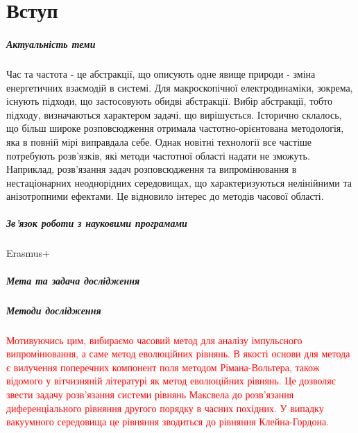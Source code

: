 \chapter*{Вступ}

\paragraph{Актуальність теми}

Час та частота - це абстракції, що описують одне явище природи - зміна
енергетичних взаємодій в системі. Для макроскопічної електродинаміки, зокрема,
існують підходи, що застосовують обидві абстракції. Вибір абстракції, тобто 
підходу, визначаються характером задачі, що вирішується. Історично склалось, що
більш широке розповсюдження отримала частотно-орієнтована методологія, яка в 
повній мірі виправдала себе. Однак новітні технології все частіше потребують 
розв'язків, які методи частотної області надати не зможуть. Наприклад, 
розв'язання задач розповсюдження та випромінювання в нестаціонарних 
неоднорідних середовищах, що характеризуються нелінійними та анізотропними 
ефектами. Це відновило інтерес до методів часової області.

\paragraph{Зв'язок роботи з науковими програмами}

Erasmus+

\paragraph{Мета та задача дослідження}

\paragraph{Методи дослідження}

\textcolor{red}{
Мотивуючись цим, вибираємо часовий метод для аналізу імпульсного випромінювання,
а саме метод еволюційних рівнянь. В якості основи для метода є вилучення 
поперечних компонент поля методом Рімана-Вольтера, також відомого у вітчизняній 
літературі як метод еволюційних рівнянь. Це дозволяє звести задачу розв'язання 
системи рівнянь Максвела до розв'язання диференціального рівняння другого 
порядку в часних похідних. У випадку вакуумного середовища це рівняння 
зводиться до рівняння Клейна-Гордона.}


